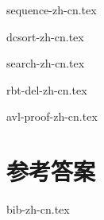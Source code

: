 \documentclass[zihao=5, b5paper, twoside, heading=true]{ctexbook}
\begin{document}
{sequence-zh-cn.tex}

{dcsort-zh-cn.tex}

{search-zh-cn.tex}

\backmatter

\appendix
\noappendicestocpagenum
\addappheadtotoc

\renewcommand{\thechapter}{\Alph{chapter}}
\renewcommand{\thesection}{\Roman{section}}
\renewcommand{\thesubsection}{\fnsymbol{subsection}}

{rbt-del-zh-cn.tex}

{avl-proof-zh-cn.tex}


\chapter{参考答案}
\shipoutAnswer

{bib-zh-cn.tex}



\printindex
\end{document}
